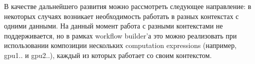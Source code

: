 \documentclass[14pt]{matmex-diploma-custom}
\begin{document}
В качестве дальнейшего развития можно рассмотреть следующее направление: в некоторых случаях возникает необходимость работать в разных контекстах с одними данными. На данный момент работа с разными контекстами не поддерживается, но в рамках workflow builder’а это можно реализовать при использовании композиции нескольких computation expressions (например, gpu1{..} и gpu2{..}), каждый из которых работает со своим контекстом. 

\setmonofont[Mapping=tex-text]{CMU Typewriter Text}


\end{document}
